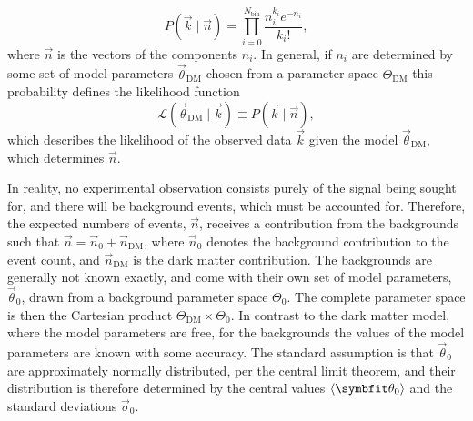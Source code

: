 \begin{equation}
    P(\vec{k}\mid \vec{n})=\prod_{i=0}^{N_\text{bin}}\frac{n_i^{k_i}e^{-n_i}}{{k_i}!},
\end{equation}
where $\vec{n}$ is the vectors of the components $n_i$. In general, if $n_i$ are determined by some set of model parameters $\vec{\theta}_\text{DM}$ chosen from a parameter space $\Theta_\text{DM}$ this probability defines the likelihood function
\begin{equation}
    \mathcal{L}(\vec{\theta}_\text{DM}\mid\vec{k})\equiv P(\vec{k}\mid \vec{n}),
\end{equation}
which describes the likelihood of the observed data $\vec{k}$ given the model $\vec{\theta}_\text{DM}$, which determines $\vec{n}$.

In reality, no experimental observation consists purely of the signal being sought for, and there will be background events, which must be accounted for. Therefore, the expected numbers of events, $\vec{n}$, receives a contribution from the backgrounds such that $\vec{n}=\vec{n}_\text{0}+\vec{n}_\text{DM}$, where $\vec{n}_\text{0}$ denotes the background contribution to the event count, and $\vec{n}_\text{DM}$ is the dark matter contribution. The backgrounds are generally not known exactly, and come with their own set of model parameters, $\vec{\theta}_0$, drawn from a background parameter space $\Theta_0$. The complete parameter space is then the Cartesian product $\Theta_\text{DM}\times\Theta_0$. In contrast to the dark matter model, where the model parameters are free, for the backgrounds the values of the model parameters are known with some accuracy. The standard assumption is that $\vec{\theta}_0$ are approximately normally distributed, per the central limit theorem, and their distribution is therefore determined by the central values $\tmean{\vec{\theta}_0}$ and the standard deviations $\vec{\sigma}_0$.

